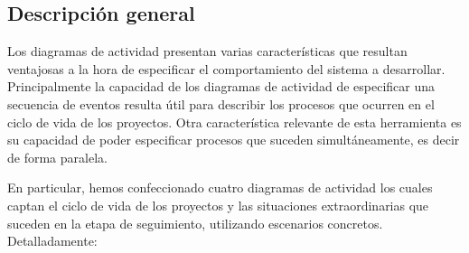 \subsection{Descripción general}
Los diagramas de actividad presentan varias características que resultan ventajosas a la hora de especificar el comportamiento del sistema a desarrollar.
Principalmente la capacidad de los diagramas de actividad de especificar una secuencia de eventos resulta útil para describir los procesos que ocurren en el ciclo de vida de los proyectos. Otra característica relevante de esta herramienta es su capacidad de poder especificar procesos que suceden simultáneamente, es decir de forma paralela.

En particular, hemos confeccionado cuatro diagramas de actividad los cuales captan el ciclo de vida de los proyectos y las situaciones extraordinarias que suceden en la etapa de seguimiento, utilizando escenarios concretos. Detalladamente:

